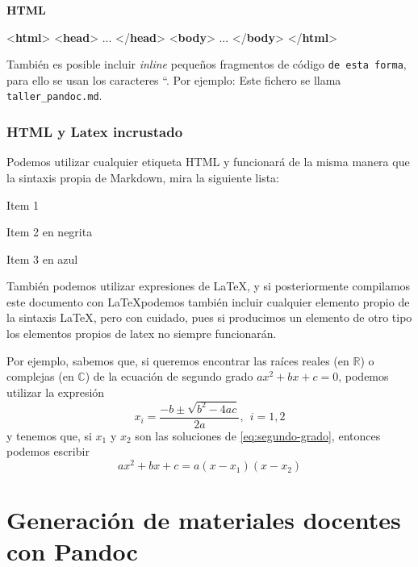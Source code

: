 \documentclass[
]{article}
\newenvironment{Shaded}{}{}
\newcommand{\DataTypeTok}[1]{\textcolor[rgb]{0.56,0.13,0.00}{#1}}
\newcommand{\KeywordTok}[1]{\textcolor[rgb]{0.00,0.44,0.13}{\textbf{#1}}}
\newcommand{\NormalTok}[1]{#1}
\begin{document}
\textbf{HTML}

\begin{Shaded}
\begin{Highlighting}[]
\DataTypeTok{\textless{}}\KeywordTok{html}\DataTypeTok{\textgreater{}}
    \DataTypeTok{\textless{}}\KeywordTok{head}\DataTypeTok{\textgreater{}}
\NormalTok{        ...}
    \DataTypeTok{\textless{}/}\KeywordTok{head}\DataTypeTok{\textgreater{}}
    \DataTypeTok{\textless{}}\KeywordTok{body}\DataTypeTok{\textgreater{}}
\NormalTok{        ...}
    \DataTypeTok{\textless{}/}\KeywordTok{body}\DataTypeTok{\textgreater{}}
\DataTypeTok{\textless{}/}\KeywordTok{html}\DataTypeTok{\textgreater{}}
\end{Highlighting}
\end{Shaded}

También es posible incluir \emph{inline} pequeños fragmentos de código
\texttt{de\ esta\ forma}, para ello se usan los caracteres ``. Por
ejemplo: Este fichero se llama \texttt{taller\_pandoc.md}.

\subsubsection{HTML y Latex incrustado}\label{html-y-latex-incrustado}

Podemos utilizar cualquier etiqueta HTML y funcionará de la misma manera
que la sintaxis propia de Markdown, mira la siguiente lista:

Item 1

Item 2 en negrita

Item 3 en azul

También podemos utilizar expresiones de \LaTeX, y si posteriormente
compilamos este documento con \LaTeX podemos también incluir cualquier
elemento propio de la sintaxis \LaTeX, pero con cuidado, pues si
producimos un elemento de otro tipo los elementos propios de latex no
siempre funcionarán.

Por ejemplo, sabemos que, si queremos encontrar las raíces reales (en
\(\mathbb R\)) o complejas (en \(\mathbb C\)) de la ecuación de segundo
grado \(ax^2 + bx + c = 0\), podemos utilizar la expresión
\begin{equation}
\label{eq:segundo-grado}
x_i = \dfrac{-b \pm \sqrt{b^2-4ac}}{2a}, \ \ i=1,2
\end{equation} y tenemos que, si \(x_1\) y \(x_2\) son las soluciones de
\eqref{eq:segundo-grado}, entonces podemos escribir \[
ax^2 + bx + c = a(x-x_1)(x-x_2)
\]

\section{Generación de materiales docentes con
Pandoc}\label{generaciuxf3n-de-materiales-docentes-con-pandoc}
\end{document}
